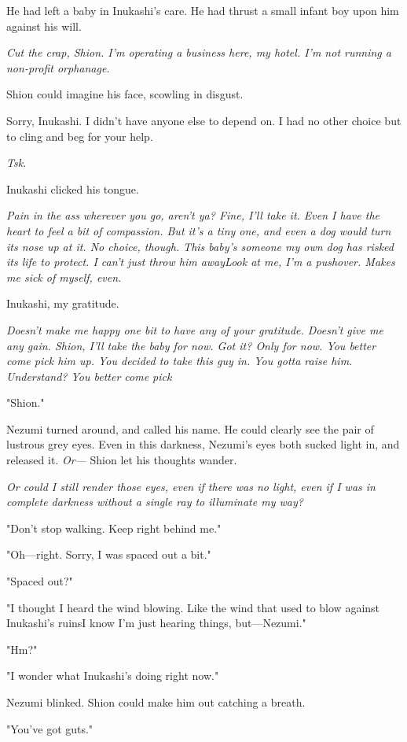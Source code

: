 He had left a baby in Inukashi's care. He had thrust a small infant boy
upon him against his will.

\emph{Cut the crap, Shion. I'm operating a business here, my hotel. I'm not
running a non-profit orphanage.}

Shion could imagine his face, scowling in disgust.

Sorry, Inukashi. I didn't have anyone else to depend on. I had no other
choice but to cling and beg for your help.

\emph{Tsk.}

Inukashi clicked his tongue.

\emph{Pain in the ass wherever you go, aren't ya? Fine, I'll take it. Even I
have the heart to feel a bit of compassion. But it's a tiny one, and
even a dog would turn its nose up at it. No choice, though. This baby's
someone my own dog has risked its life to protect. I can't just throw
him away\el Look at me, I'm a pushover. Makes me sick of myself, even.}

Inukashi, my gratitude.

\emph{Doesn't make me happy one bit to have any of your gratitude. Doesn't
give me any gain. Shion, I'll take the baby \emph{for now}. Got it? Only for
now. You better come pick him up. You decided to take this guy in. You
gotta raise him. Understand? You better come pick\el }

"Shion."

Nezumi turned around, and called his name. He could clearly see the pair
of lustrous grey eyes. Even in this darkness, Nezumi's eyes both sucked
light in, and released it. \emph{Or---} Shion let his thoughts wander.

\emph{Or could I still render those eyes, even if there was no light, even if
I was in complete darkness without a single ray to illuminate my way?}

"Don't stop walking. Keep right behind me."

"Oh---right. Sorry, I was spaced out a bit."

"Spaced out?"

"I thought I heard the wind blowing. Like the wind that used to blow
against Inukashi's ruins\el I know I'm just hearing things, but---Nezumi."

"Hm?"

"I wonder what Inukashi's doing right now."

Nezumi blinked. Shion could make him out catching a breath.

"You've got guts."

